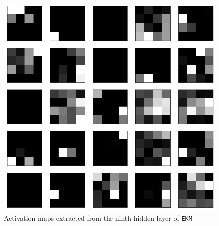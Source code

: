 \documentclass[aps,twocolumn,secnumarabic,nobalancelastpage,amsmath,amssymb,
nofootinbib]{revtex4}
\begin{document}
\begin{figure}[h!]
	\centering
	\includegraphics[width=0.6\linewidth]{Images/FeatureMaps2}
	
	\caption{Activation maps extracted from the ninth hidden layer of \texttt{EKM}}
	\label{fig:fm2}
\end{figure}

\pagebreak

\nocite{*}

\end{document}
